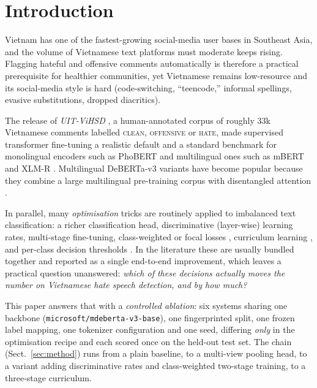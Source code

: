 \section{Introduction}
\label{sec:intro}

Vietnam has one of the fastest-growing social-media user bases in Southeast Asia,
and the volume of Vietnamese text platforms must moderate keeps rising.  Flagging
hateful and offensive comments automatically is therefore a practical prerequisite
for healthier communities, yet Vietnamese remains low-resource and its social-media
style is hard (code-switching, ``teencode,'' informal spellings, evasive
substitutions, dropped diacritics).

The release of \emph{UIT-ViHSD} \cite{luu2021vihsd}, a human-annotated corpus of
roughly 33k Vietnamese comments labelled \textsc{clean}, \textsc{offensive} or
\textsc{hate}, made supervised transformer fine-tuning a realistic default and a
standard benchmark for monolingual encoders such as PhoBERT \cite{nguyen2020phobert}
and multilingual ones such as mBERT and XLM-R
\cite{conneau2020xlmr,nguyen2022smtce,hoang2023vihos}.  Multilingual DeBERTa-v3
variants have become popular because they combine a large multilingual pre-training
corpus with disentangled attention \cite{he2021deberta,he2023debertav3}.

In parallel, many \emph{optimisation} tricks are routinely applied to imbalanced
text classification: a richer classification head, discriminative (layer-wise)
learning rates, multi-stage fine-tuning, class-weighted or focal losses
\cite{lin2017focal}, curriculum learning \cite{bengio2009curriculum}, and per-class
decision thresholds \cite{saito2015precision}.  In the literature these are usually
bundled together and reported as a single end-to-end improvement, which leaves a
practical question unanswered: \emph{which of these decisions actually moves the
number on Vietnamese hate speech detection, and by how much?}

This paper answers that with a \emph{controlled ablation}: six systems sharing one
backbone (\texttt{microsoft/mdeberta-v3-base}), one fingerprinted split, one frozen
label mapping, one tokenizer configuration and one seed, differing \emph{only} in
the optimisation recipe and each scored once on the held-out test set.  The chain
(Sect.~\ref{sec:method}) runs from a plain baseline, to a multi-view pooling head,
to a variant adding discriminative rates and class-weighted two-stage training, to a
three-stage curriculum.

